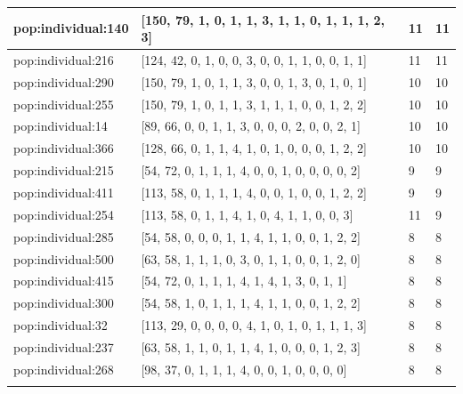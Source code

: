 \begin{table}
\begin{tabular}{p{3cm} p{4cm} p{3cm} p{3cm}}
\small{pop:individual:140} & \small{[150, 79, 1, 0, 1, 1, 3, 1, 1, 0, 1, 1, 1, 2, 3]}
& \small{11} & \small{11}\\ \hline
\small{pop:individual:216} & \small{[124, 42, 0, 1, 0, 0, 3, 0, 0, 1, 1, 0, 0, 1, 1]}
& \small{11} & \small{11}\\ \hline
\small{pop:individual:290} & \small{[150, 79, 1, 0, 1, 1, 3, 0, 0, 1, 3, 0, 1, 0, 1]}
& \small{10} & \small{10}\\ \hline
\small{pop:individual:255} & \small{[150, 79, 1, 0, 1, 1, 3, 1, 1, 1, 0, 0, 1, 2, 2]}
& \small{10} & \small{10}\\ \hline
\small{pop:individual:14} & \small{[89, 66, 0, 0, 1, 1, 3, 0, 0, 0, 2, 0, 0, 2, 1]}
& \small{10} & \small{10}\\ \hline
\small{pop:individual:366} & \small{[128, 66, 0, 1, 1, 4, 1, 0, 1, 0, 0, 0, 1, 2, 2]}
& \small{10} & \small{10}\\ \hline
\small{pop:individual:215} & \small{[54, 72, 0, 1, 1, 1, 4, 0, 0, 1, 0, 0, 0, 0, 2]}
& \small{9} & \small{9}\\ \hline
\small{pop:individual:411} & \small{[113, 58, 0, 1, 1, 1, 4, 0, 0, 1, 0, 0, 1, 2, 2]}
& \small{9} & \small{9}\\ \hline
\small{pop:individual:254} & \small{[113, 58, 0, 1, 1, 4, 1, 0, 4, 1, 1, 0, 0, 3]}
& \small{11} & \small{9}\\ \hline
\small{pop:individual:285} & \small{[54, 58, 0, 0, 0, 1, 1, 4, 1, 1, 0, 0, 1, 2, 2]}
& \small{8} & \small{8}\\ \hline
\small{pop:individual:500} & \small{[63, 58, 1, 1, 1, 0, 3, 0, 1, 1, 0, 0, 1, 2, 0]}
& \small{8} & \small{8}\\ \hline
\small{pop:individual:415} & \small{[54, 72, 0, 1, 1, 1, 4, 1, 4, 1, 3, 0, 1, 1]}
& \small{8} & \small{8}\\ \hline
\small{pop:individual:300} & \small{[54, 58, 1, 0, 1, 1, 1, 4, 1, 1, 0, 0, 1, 2, 2]}
& \small{8} & \small{8}\\ \hline
\small{pop:individual:32} & \small{[113, 29, 0, 0, 0, 0, 4, 1, 0, 1, 0, 1, 1, 1, 3]}
& \small{8} & \small{8}\\ \hline
\small{pop:individual:237} & \small{[63, 58, 1, 1, 0, 1, 1, 4, 1, 0, 0, 0, 1, 2, 3]}
& \small{8} & \small{8}\\ \hline
\small{pop:individual:268} & \small{[98, 37, 0, 1, 1, 1, 4, 0, 0, 1, 0, 0, 0, 0]}
& \small{8} & \small{8}\\ \hline
\noalign{\smallskip}\hline
\end{tabular}
\end{table}

